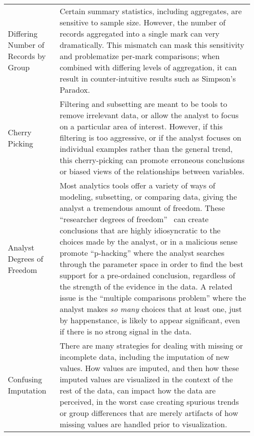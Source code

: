 \begin{table*}[ht!]
\begin{tabular}{p{2.2cm}p{14.8cm}}
   \rowcolor{colorb}\multirow{4}{0em}{\hspace{-0.6cm}\rotatebox{90}{\normalsize{Wrangling}}}Differing Number \newline of Records by \newline Group  & Certain summary statistics, including aggregates, are sensitive to sample size. However, the number of records aggregated into a single mark can very dramatically. This mismatch can mask this sensitivity and problematize per-mark comparisons; when combined with differing levels of aggregation, it can result in counter-intuitive results such as Simpson's Paradox. \cite{guo2017you}\\
 \rowcolor{colorb-opaque}Cherry Picking & Filtering and subsetting are meant to be tools to remove irrelevant data, or allow the analyst to focus on a particular area of interest. However, if this filtering is too aggressive, or if the analyst focuses on individual examples rather than the general trend, this cherry-picking can promote erroneous conclusions or biased views of the relationships between variables. \cite{few2019loom}\\
 \rowcolor{colorb}Analyst Degrees of Freedom & Most analytics tools offer a variety of ways of modeling, subsetting, or comparing data, giving the analyst a tremendous amount of freedom. These ``researcher degrees of freedom''~\cite{} can create conclusions that are highly idiosyncratic to the choices made by the analyst, or in a malicious sense promote ``p-hacking'' where the analyst searches through the parameter space in order to find the best support for a pre-ordained conclusion, regardless of the strength of the evidence in the data. A related issue is the ``multiple comparisons problem'' where the analyst makes \emph{so many} choices that at least one, just by happenstance, is likely to appear significant, even if there is no strong signal in the data. \cite{gelman2013garden,pu2018garden,zgraggen2018investigating}\\
 \rowcolor{colorb-opaque}Confusing Imputation  & There are many strategies for dealing with missing or incomplete data, including the imputation of new values. How values are imputed, and then how these imputed values are visualized in the context of the rest of the data, can impact how the data are perceived, in the worst case creating spurious trends or group differences that are merely artifacts of how missing values are handled prior to visualization. \cite{song2018s}\\


\end{tabular}
\end{table*}
